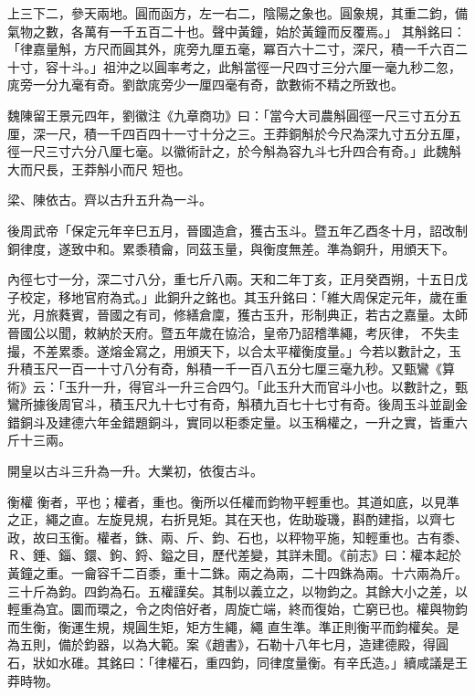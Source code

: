\begin{pinyinscope}
 上三下二，參天兩地。圓而函方，左一右二，陰陽之象也。圓象規，其重二鈞，備氣物之數，各萬有一千五百二十也。聲中黃鐘，始於黃鐘而反覆焉。」
 其斛銘曰：「律嘉量斛，方尺而圓其外，庣旁九厘五毫，冪百六十二寸，深尺，積一千六百二十寸，容十斗。」祖沖之以圓率考之，此斛當徑一尺四寸三分六厘一毫九秒二忽，庣旁一分九毫有奇。劉歆庣旁少一厘四毫有奇，歆數術不精之所致也。



 魏陳留王景元四年，劉徽注《九章商功》曰：「當今大司農斛圓徑一尺三寸五分五厘，深一尺，積一千四百四十一寸十分之三。王莽銅斛於今尺為深九寸五分五厘，徑一尺三寸六分八厘七毫。以徽術計之，於今斛為容九斗七升四合有奇。」此魏斛大而尺長，王莽斛小而尺
 短也。



 梁、陳依古。齊以古升五升為一斗。



 後周武帝「保定元年辛巳五月，晉國造倉，獲古玉斗。暨五年乙酉冬十月，詔改制銅律度，遂致中和。累黍積龠，同茲玉量，與衡度無差。準為銅升，用頒天下。



 內徑七寸一分，深二寸八分，重七斤八兩。天和二年丁亥，正月癸酉朔，十五日戊子校定，移地官府為式。」此銅升之銘也。其玉升銘曰：「維大周保定元年，歲在重光，月旅蕤賓，晉國之有司，修繕倉廩，獲古玉升，形制典正，若古之嘉量。太師晉國公以聞，敕納於天府。暨五年歲在協洽，皇帝乃詔稽準繩，考灰律，
 不失圭撮，不差累黍。遂熔金寫之，用頒天下，以合太平權衡度量。」今若以數計之，玉升積玉尺一百一十寸八分有奇，斛積一千一百八五分七厘三毫九秒。又甄鸞《算術》云：「玉升一升，得官斗一升三合四勺。「此玉升大而官斗小也。以數計之，甄鸞所據後周官斗，積玉尺九十七寸有奇，斛積九百七十七寸有奇。後周玉斗並副金錯銅斗及建德六年金錯題銅斗，實同以秬黍定量。以玉稱權之，一升之實，皆重六斤十三兩。



 開皇以古斗三升為一升。大業初，依復古斗。



 衡權
 衡者，平也；權者，重也。衡所以任權而鈞物平輕重也。其道如底，以見準之正，繩之直。左旋見規，右折見矩。其在天也，佐助璇璣，斟酌建指，以齊七政，故曰玉衡。權者，銖、兩、斤、鈞、石也，以秤物平施，知輕重也。古有黍、Ｒ、錘、錙、鐶、鉤、鋝、鎰之目，歷代差變，其詳未聞。《前志》曰：權本起於黃鐘之重。一龠容千二百黍，重十二銖。兩之為兩，二十四銖為兩。十六兩為斤。三十斤為鈞。四鈞為石。五權謹矣。其制以義立之，以物鈞之。其餘大小之差，以輕重為宜。圜而環之，令之肉倍好者，周旋亡端，終而復始，亡窮已也。權與物鈞而生衡，衡運生規，規圓生矩，矩方生繩，繩
 直生準。準正則衡平而鈞權矣。是為五則，備於鈞器，以為大範。案《趙書》，石勒十八年七月，造建德殿，得圓石，狀如水碓。其銘曰：「律權石，重四鈞，同律度量衡。有辛氏造。」續咸議是王莽時物。




\end{pinyinscope}
